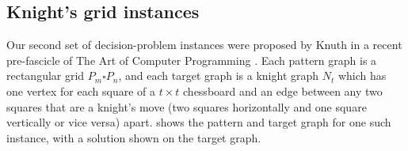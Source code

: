 
\FloatBarrier

\subsection{Knight's grid instances}\label{subsec:si-knights-experiment}

Our second set of decision-problem instances were proposed by Knuth in a recent pre-fascicle
of The Art of Computer Programming \cite{knuth2022art}.  Each pattern graph is a rectangular grid
$P_m \square P_n$, and each target graph is a knight graph $N_t$ which has one vertex for each
square of a $t \times t$ chessboard and an edge between any two squares that are a knight's
move (two squares horizontally and one square vertically or vice versa) apart.
 shows the pattern and target graph for one such instance,
with a solution shown on the target graph.

